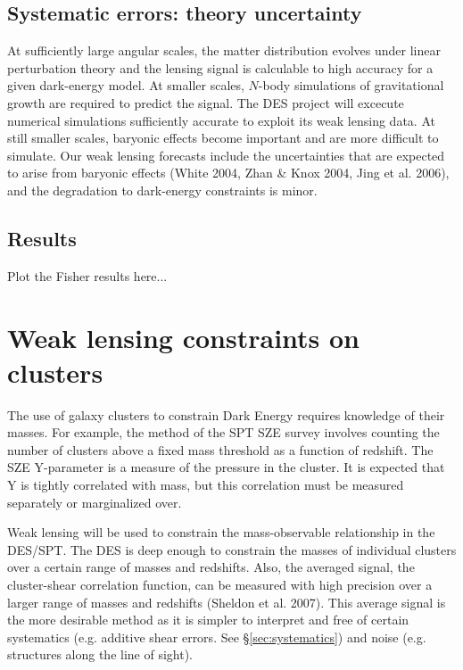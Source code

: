 \documentclass[preprint]{aastex}
\begin{document}
\subsection{Systematic errors: theory uncertainty}

At sufficiently large angular scales, the matter distribution evolves
under linear perturbation theory and the lensing signal is calculable
to high accuracy for a given dark-energy model.  At smaller scales,
$N$-body simulations of gravitational growth are required to predict
the signal.  The DES project will excecute numerical simulations
sufficiently accurate to exploit its weak lensing data.
At still smaller scales, baryonic effects become important and are
more difficult to simulate.  Our weak lensing forecasts include the
uncertainties that are expected to arise from baryonic effects
(White 2004, Zhan \& Knox 2004, Jing et al. 2006), and the degradation
to dark-energy constraints is minor. 

\subsection{Results}
Plot the Fisher results here...

\section{Weak lensing constraints on clusters}

The use of galaxy clusters to constrain Dark Energy requires knowledge of their
masses.  For example, the method of the SPT SZE survey involves counting the
number of clusters above a fixed mass threshold as a function of redshift.  The
SZE Y-parameter is a measure of the pressure in the cluster. It is expected
that Y is tightly correlated with mass, but this correlation must be measured
separately or marginalized over.

Weak lensing will be used to constrain the mass-observable relationship in the
DES/SPT.  The DES is deep enough to constrain the masses of individual clusters
over a certain range of masses and redshifts.  Also, the averaged signal, the
cluster-shear correlation function, can be measured with high precision over a
larger range of masses and redshifts (Sheldon et al. 2007).  This average
signal is the more desirable method as it is simpler to interpret and free of
certain systematics (e.g. additive shear errors. See \S \ref{sec:systematics})
and noise (e.g.  structures along the line of sight).
\end{document}
